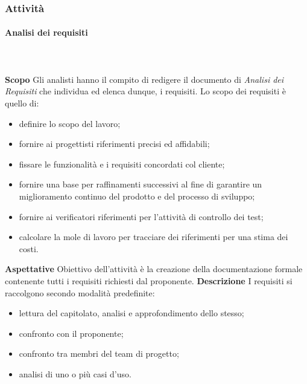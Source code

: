 	\subsubsection{Attività}
		\paragraph{Analisi dei requisiti} \mbox{}\\ \mbox{}\\
			\textbf{Scopo} \newline \newline
			Gli analisti hanno il compito di redigere il documento di
			\textit{Analisi dei Requisiti} che individua ed elenca dunque, i requisiti.
			Lo scopo dei requisiti è quello di:
			\begin{itemize}
				\item definire lo scopo del lavoro;
				\item fornire ai progettisti riferimenti precisi ed affidabili;
				\item fissare le funzionalità e i requisiti concordati col cliente;
				\item fornire  una  base  per  raffinamenti  successivi  al  fine  di  garantire  un miglioramento continuo del prodotto e del processo di sviluppo;
				\item fornire ai verificatori riferimenti per l'attività di controllo dei test;
				\item calcolare la mole di lavoro per tracciare dei riferimenti per una stima dei costi.
			\end{itemize}
			\textbf{Aspettative} \newline \newline
			Obiettivo dell'attività è la creazione della documentazione formale contenente tutti i
			requisiti richiesti dal proponente. \newline \newline
			\textbf{Descrizione} \newline \newline
			I requisiti si raccolgono secondo modalità predefinite:
			\begin{itemize}
				\item lettura del capitolato\glo, analisi e approfondimento dello stesso;
				\item confronto con il proponente;
				\item confronto tra membri del team di progetto;
				\item analisi di uno o più casi d'uso.  \\
			\end{itemize}
